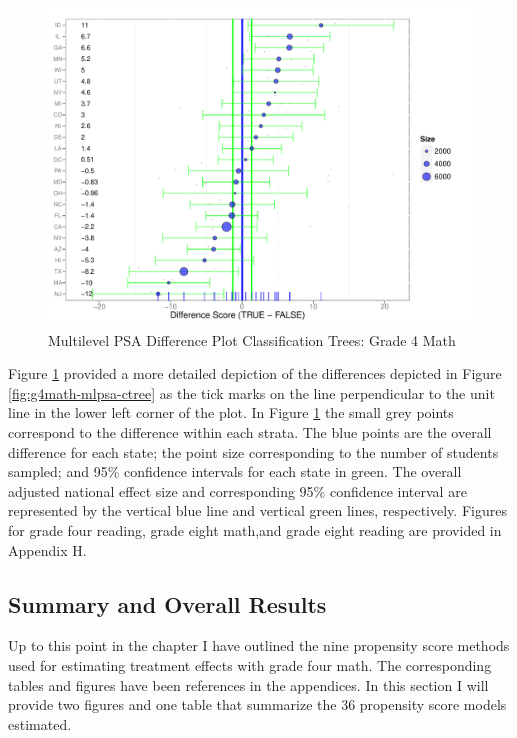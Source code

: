 \documentclass[letterpaper,12p,twoside]{article} %
\begin{document}
\begin{figure}[t]
\begin{center}
\includegraphics[width=\textwidth]{../Figures2009/g4math-mlpsa-ctree-diff.pdf}
\caption{Multilevel PSA Difference Plot Classification Trees: Grade 4 Math}
\label{fig:g4math-mlpsa-ctree-diff}
\end{center}
\end{figure}

Figure \ref{fig:g4math-mlpsa-ctree-diff} provided a more detailed depiction of the differences depicted in Figure \ref{fig:g4math-mlpsa-ctree} as the tick marks on the line perpendicular to the unit line in the lower left corner of the plot. In Figure \ref{fig:g4math-mlpsa-ctree-diff} the small grey points correspond to the difference within each strata. The blue points are the overall difference for each state; the point size corresponding to the number of students sampled; and 95\% confidence intervals for each state in green. The overall adjusted national effect size and corresponding 95\% confidence interval are represented by the vertical blue line and vertical green lines, respectively. Figures for grade four reading, grade eight math,and grade eight reading are provided in Appendix H.

\clearpage
\subsection{Summary and Overall Results}

Up to this point in the chapter I have outlined the nine propensity score methods used for estimating treatment effects with grade four math. The corresponding tables and figures have been references in the appendices. In this section I will provide two figures and one table that summarize the 36 propensity score models estimated.
\end{document}
